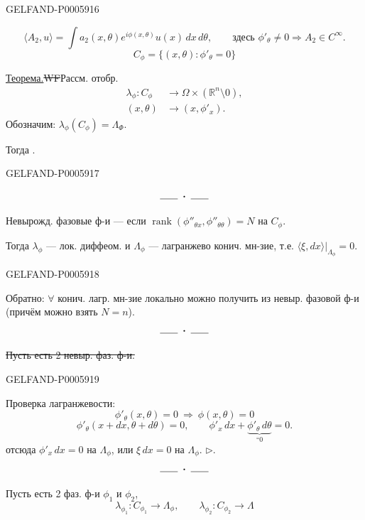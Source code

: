 \begin{GelfandAdjacentEvidence}{GELFAND-P000591}{6}


\[
\langle A_2,u\rangle=\int a_2(x,\theta)e^{i\phi(x,\theta)}u(x)\,dx\,d\theta,
\qquad\text{здесь }\phi'_\theta\ne0\Rightarrow A_2\in C^\infty.
\]
\[
C_\phi=\{(x,\theta):\phi'_\theta=0\}
\]

\underline{Теорема.}\quad\sout{WF}\quad Рассм. отобр.
\[
\begin{aligned}
\lambda_\phi:C_\phi &\longrightarrow\Omega\times(\mathbb R^n\setminus0),\\
(x,\theta)&\longrightarrow(x,\phi'_x).
\end{aligned}
\]
Обозначим: \(\lambda_\phi(C_\phi)=\Lambda_\Phi\).

Тогда .
\end{GelfandAdjacentEvidence}
\begin{GelfandAdjacentEvidence}{GELFAND-P000591}{7}

\[
\rule{1.8em}{.4pt}\;\boldsymbol{\cdot}\;\rule{1.8em}{.4pt}
\]

Невырожд. фазовые ф-и — если
\(\operatorname{rank}(\phi''_{\theta x},\phi''_{\theta\theta})=N\)
на \(C_\phi\).

Тогда \(\lambda_\phi\) — лок. диффеом. и
\(\Lambda_\phi\) — лагранжево конич. мн-зие,
т.е. \(\langle\xi,dx\rangle|_{\Lambda_\phi}=0\).
\end{GelfandAdjacentEvidence}
\begin{GelfandAdjacentEvidence}{GELFAND-P000591}{8}


Обратно: \(\forall\) конич. лагр. мн-зие локально можно получить из невыр. фазовой ф-и
(причём можно взять \(N=n\)).
\[
\rule{1.8em}{.4pt}\;\boldsymbol{\cdot}\;\rule{1.8em}{.4pt}
\]

\sout{Пусть есть 2 невыр. фаз. ф-и.}
\end{GelfandAdjacentEvidence}
\begin{GelfandAdjacentEvidence}{GELFAND-P000591}{9}

Проверка лагранжевости:
\[
\phi'_\theta(x,\theta)=0\ \Rightarrow\ \phi(x,\theta)=0
\]
\[
\phi'_\theta(x+dx,\theta+d\theta)=0,\qquad
\phi'_x\,dx+\underbrace{\phi'_\theta\,d\theta}_{\text{“}0}=0.
\]
отсюда \(\phi'_x\,dx=0\) на \(\Lambda_\phi\), или
\(\xi\,dx=0\) на \(\Lambda_\phi\). \(\triangleright\).
\[
\rule{1.8em}{.4pt}\;\boldsymbol{\cdot}\;\rule{1.8em}{.4pt}
\]

Пусть есть 2 фаз. ф-и \(\phi_1\) и \(\phi_2\),
\[
\lambda_{\phi_1}:C_{\phi_1}\to\Lambda_\phi,\qquad
\lambda_{\phi_2}:C_{\phi_2}\to\Lambda
\]
\end{GelfandAdjacentEvidence}
